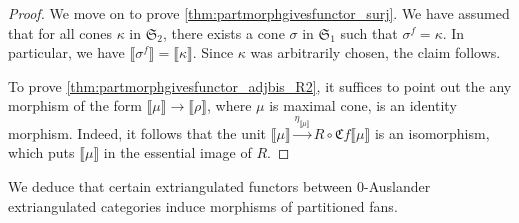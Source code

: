 \documentclass[10pt,twoside, a4paper,reqno]{amsart}
\newcommand{\eqclass}[1]{ \llbracket #1 \rrbracket }
\newcommand{\catof}{\mathfrak{C}}
\newcommand{\Sfan}{\mathfrak{S}}
\theoremstyle{definition}
\begin{document}
\begin{proof}
    We move on to prove
    \eqref{thm:partmorphgivesfunctor_surj}. We have assumed that for all cones ${\kappa}$ in $\Sfan_2$, there exists a cone $\sigma$ in $\Sfan_1$ such that $\sigma^f={\kappa}$. In particular, we have $\eqclass{\sigma^f}=\eqclass{{\kappa}}$. Since ${\kappa}$ was arbitrarily chosen, the claim follows.

To prove \eqref{thm:partmorphgivesfunctor_adjbis_R2}, it suffices to point out the any morphism of the form $\eqclass{\mu}\xrightarrow{} \eqclass{\rho}$, where $\mu$ is maximal cone, is an identity morphism. Indeed, it follows that the unit $\eqclass{\mu}\xrightarrow{\eta_{\eqclass{\mu}}} R\circ\catof f\eqclass{\mu}$ is an isomorphism, which puts $\eqclass{\mu}$ in the essential image of $R$.
\end{proof}


{We deduce that certain extriangulated functors between 0-Auslander extriangulated categories induce morphisms of partitioned fans. }
\end{document}
